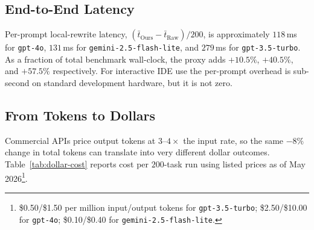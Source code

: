 \documentclass[11pt,a4paper,twocolumn]{article}
\begin{document}
\subsection{End-to-End Latency}
\label{sec:results-latency}
Per-prompt local-rewrite latency, $(\bar{t}_{\text{Ours}}-\bar{t}_{\text{Raw}})/200$, is approximately $118$\,ms for \texttt{gpt-4o}, $131$\,ms for \texttt{gemini-2.5-flash-lite}, and $279$\,ms for \texttt{gpt-3.5-turbo}. As a fraction of total benchmark wall-clock, the proxy adds $+10.5\%$, $+40.5\%$, and $+57.5\%$ respectively. For interactive IDE use the per-prompt overhead is sub-second on standard development hardware, but it is not zero.

\subsection{From Tokens to Dollars}
\label{sec:results-dollars}
Commercial APIs price output tokens at $3$--$4\times$ the input rate, so the same $-8\%$ change in total tokens can translate into very different dollar outcomes. Table~\ref{tab:dollar-cost} reports cost per $200$-task run using listed prices as of May 2026\footnote{\$0.50/\$1.50 per million input/output tokens for \texttt{gpt-3.5-turbo}; \$2.50/\$10.00 for \texttt{gpt-4o}; \$0.10/\$0.40 for \texttt{gemini-2.5-flash-lite}.}.

\begin{table}[t]
\centering
\footnotesize
\setlength{\tabcolsep}{2pt}
\caption{Per-200-task cloud-API cost in USD; $\Delta$ columns are percent change vs.\ Raw. \texttt{gpt-3.5} and \texttt{gemini-lite} abbreviate \texttt{gpt-3.5-turbo} and \texttt{gemini-2.5-flash-lite}. Local-compute cost (Llama 3.2 3B at $\sim$$100$\,W for $\sim$$176$\,ms/query) is $\sim$\$0.07 per $100{,}000$ queries and omitted.}
\label{tab:dollar-cost}
\end{table}
\end{document}
